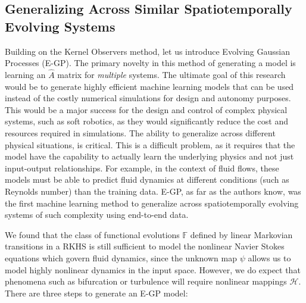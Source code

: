 \documentclass[letterpaper,12pt,peerreviewca,draftcls]{IEEEtran}
\newcommand{\fspace}{\mathcal{H}}
\newcommand{\fmap}{\psi}
\newcommand{\dualop}{A}
\newcommand{\dualopApprox}{\widehat{\dualop}}
\begin{document}
\subsection{Generalizing Across Similar Spatiotemporally Evolving Systems} \label{sec:egp}
Building on the Kernel Observers method, let us introduce Evolving Gaussian Processes (E-GP). The primary novelty in this method of generating a model is learning an $\dualopApprox$ matrix for \emph{multiple} systems. The ultimate goal of this research would be to generate highly efficient machine learning models that can be used instead of the costly numerical simulations for design and autonomy purposes. This would be a major success for the design and control of complex physical systems, such as soft robotics, as they would significantly reduce the cost and resources required in simulations. The ability to generalize across different physical situations, is critical. This is a difficult problem, as it requires that the model have the capability to actually learn the underlying physics and not just input-output relationships. For example, in the context of fluid flows, these models must be able to predict fluid dynamics at different conditions (such as Reynolds number) than the training data. E-GP, as far as the authors know, was the first machine learning method to generalize across spatiotemporally evolving systems of such complexity using end-to-end data.

We found that the class of functional evolutions $\mathbb{F}$ defined by linear Markovian transitions in a RKHS is still sufficient to model the nonlinear Navier Stokes equations which govern fluid dynamics, since the unknown map $\fmap$ allows us to model highly nonlinear dynamics in the input space. However, we do expect that phenomena such as bifurcation or turbulence will require nonlinear mappings $\fspace$. There are three steps to generate an E-GP model:
\end{document}
